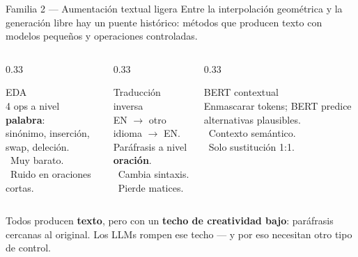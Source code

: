 \begin{frame}{Familia 2 — Aumentación textual ligera}
\small
Entre la \alert{interpolación geométrica} y la \alert{generación libre} hay un puente histórico: métodos que producen texto con modelos pequeños y operaciones controladas.

\vspace{0.5em}
\begin{columns}[T]

\begin{column}{0.33\textwidth}
\begin{block}{EDA}
\scriptsize
{}\\[3pt]
4 ops a nivel \textbf{palabra}:\\
sinónimo, inserción, swap, deleción.\\[3pt]
\good\ Muy barato.\\
\bad\ Ruido en oraciones cortas.
\end{block}
\end{column}

\begin{column}{0.33\textwidth}
\begin{block}{Traducción inversa}
\scriptsize
{}\\[3pt]
EN $\to$ otro idioma $\to$ EN.\\
Paráfrasis a nivel \textbf{oración}.\\[3pt]
\good\ Cambia sintaxis.\\
\bad\ Pierde matices.
\end{block}
\end{column}

\begin{column}{0.33\textwidth}
\begin{block}{BERT contextual}
\scriptsize
{}\\[3pt]
Enmascarar tokens; BERT predice alternativas plausibles.\\[3pt]
\good\ Contexto semántico.\\
\bad\ Solo sustitución 1:1.
\end{block}
\end{column}

\end{columns}

\vspace{0.7em}
\begin{insight}
\scriptsize
Todos producen \textbf{texto}, pero con un \textbf{techo de creatividad bajo}: paráfrasis cercanas al original. Los LLMs rompen ese techo --- y por eso necesitan otro tipo de control.
\end{insight}
\end{frame}

